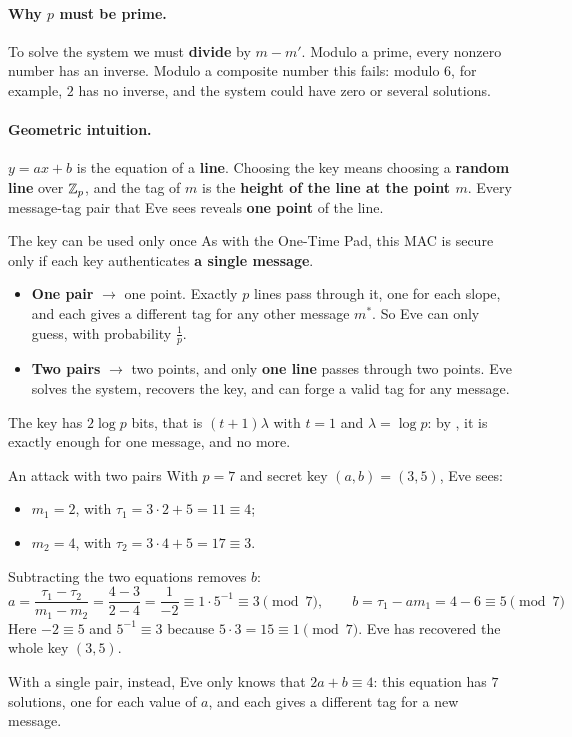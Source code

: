 \paragraph{Why $p$ must be prime.} To solve the system we must \textbf{divide} by $m - m'$. Modulo a prime, every nonzero number has an inverse. Modulo a composite number this fails: modulo $6$, for example, $2$ has no inverse, and the system could have zero or several solutions.

\paragraph{Geometric intuition.} $y = ax + b$ is the equation of a \textbf{line}. Choosing the key means choosing a \textbf{random line} over $\mathbb{Z}_p$, and the tag of $m$ is the \textbf{height of the line at the point $m$}. Every message-tag pair that Eve sees reveals \textbf{one point} of the line.

\begin{framedobs}{The key can be used only once}
  As with the One-Time Pad, this MAC is secure only if each key authenticates \textbf{a single message}.
  \begin{itemize}
    \item \textbf{One pair} $\to$ one point. Exactly $p$ lines pass through it, one for each slope, and each gives a different tag for any other message $m^*$. So Eve can only guess, with probability $\frac{1}{p}$.
    \item \textbf{Two pairs} $\to$ two points, and only \textbf{one line} passes through two points. Eve solves the system, recovers the key, and can forge a valid tag for any message.
  \end{itemize}
  The key has $2\log p$ bits, that is $(t+1)\lambda$ with $t = 1$ and $\lambda = \log p$: by , it is exactly enough for one message, and no more.
\end{framedobs}

\begin{framedex}{An attack with two pairs}
  With $p = 7$ and secret key $(a, b) = (3, 5)$, Eve sees:
  \begin{itemize}
    \item $m_1 = 2$, with $\tau_1 = 3 \cdot 2 + 5 = 11 \equiv 4$;
    \item $m_2 = 4$, with $\tau_2 = 3 \cdot 4 + 5 = 17 \equiv 3$.
  \end{itemize}
  Subtracting the two equations removes $b$:
  \[
    a = \frac{\tau_1 - \tau_2}{m_1 - m_2} = \frac{4 - 3}{2 - 4} = \frac{1}{-2} \equiv 1 \cdot 5^{-1} \equiv 3 \pmod 7,
    \qquad b = \tau_1 - a m_1 = 4 - 6 \equiv 5 \pmod 7
  \]
  Here $-2 \equiv 5$ and $5^{-1} \equiv 3$ because $5 \cdot 3 = 15 \equiv 1 \pmod 7$. Eve has recovered the whole key $(3, 5)$.

  With a single pair, instead, Eve only knows that $2a + b \equiv 4$: this equation has $7$ solutions, one for each value of $a$, and each gives a different tag for a new message.
\end{framedex}

